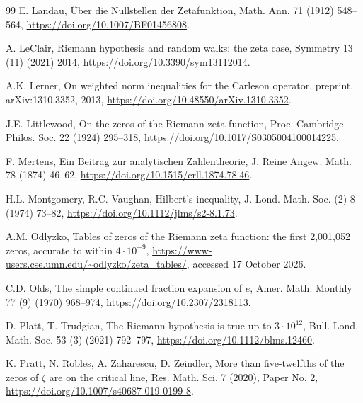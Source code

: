 \documentclass[preprint,12pt]{elsarticle}
\numberwithin{equation}{section}
\theoremstyle{plain}
\theoremstyle{definition}
\theoremstyle{remark}
\begin{document}
\begin{thebibliography}{99}
E. Landau, \"Uber die Nullstellen der Zetafunktion, Math. Ann. 71 (1912) 548--564, \href{https://doi.org/10.1007/BF01456808}{https://doi.org/10.1007/BF01456808}.

A. LeClair, Riemann hypothesis and random walks: the zeta case, Symmetry 13 (11) (2021) 2014, \href{https://doi.org/10.3390/sym13112014}{https://doi.org/10.3390/sym13112014}.

A.K. Lerner, On weighted norm inequalities for the Carleson operator, preprint, arXiv:1310.3352, 2013, \href{https://doi.org/10.48550/arXiv.1310.3352}{https://doi.org/10.48550/arXiv.1310.3352}.

J.E. Littlewood, On the zeros of the Riemann zeta-function, Proc. Cambridge Philos. Soc. 22 (1924) 295--318, \href{https://doi.org/10.1017/S0305004100014225}{https://doi.org/10.1017/S0305004100014225}.

F. Mertens, Ein Beitrag zur analytischen Zahlentheorie, J. Reine Angew. Math. 78 (1874) 46--62, \href{https://doi.org/10.1515/crll.1874.78.46}{https://doi.org/10.1515/crll.1874.78.46}.

H.L. Montgomery, R.C. Vaughan, Hilbert's inequality, J. Lond. Math. Soc. (2) 8 (1974) 73--82, \href{https://doi.org/10.1112/jlms/s2-8.1.73}{https://doi.org/10.1112/jlms/s2-8.1.73}.

A.M. Odlyzko, Tables of zeros of the Riemann zeta function: the first 2,001,052 zeros, accurate to within $4\cdot10^{-9}$, \url{https://www-users.cse.umn.edu/~odlyzko/zeta_tables/}, accessed 17 October 2026.

C.D. Olds, The simple continued fraction expansion of $e$, Amer. Math. Monthly 77 (9) (1970) 968--974, \href{https://doi.org/10.2307/2318113}{https://doi.org/10.2307/2318113}.%

D. Platt, T. Trudgian, The Riemann hypothesis is true up to $3\cdot10^{12}$, Bull. Lond. Math. Soc. 53 (3) (2021) 792--797, \href{https://doi.org/10.1112/blms.12460}{https://doi.org/10.1112/blms.12460}.%

K. Pratt, N. Robles, A. Zaharescu, D. Zeindler, More than five-twelfths of the zeros of $\zeta$ are on the critical line, Res. Math. Sci. 7 (2020), Paper No. 2, \href{https://doi.org/10.1007/s40687-019-0199-8}{https://doi.org/10.1007/s40687-019-0199-8}.%


\end{thebibliography}
\end{document}
